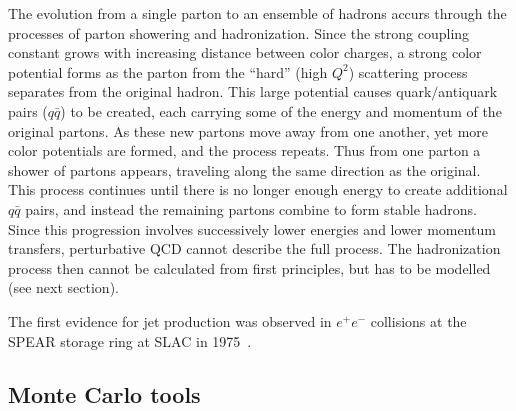 The evolution from a single parton to an ensemble of hadrons accurs through the processes of parton showering and hadronization. Since the strong coupling constant grows with increasing distance between color charges, a strong color potential forms as the parton from the ``hard'' (high $Q^2$) scattering process separates from the original hadron. This large potential causes quark$/$antiquark pairs ($q\bar{q}$) to be created, each carrying some of the energy and momentum of the original partons. As these new partons move away from one another, yet more color potentials are formed, and the process repeats. Thus from one parton a shower of partons appears, traveling along the same direction as the original.  This process continues until there is no longer enough energy to create additional $q\bar{q}$ pairs, and instead the remaining partons combine to form stable hadrons. Since this progression involves successively lower energies and lower momentum transfers, perturbative QCD cannot describe the full process.  The hadronization process then cannot be calculated from first principles, but has to be modelled (see next section). 

The first evidence for jet production was observed in $e^+e^-$ collisions at the SPEAR storage ring at SLAC in 1975~\cite{PhysRevLett.35.1609}.

\subsection{Monte Carlo tools}


